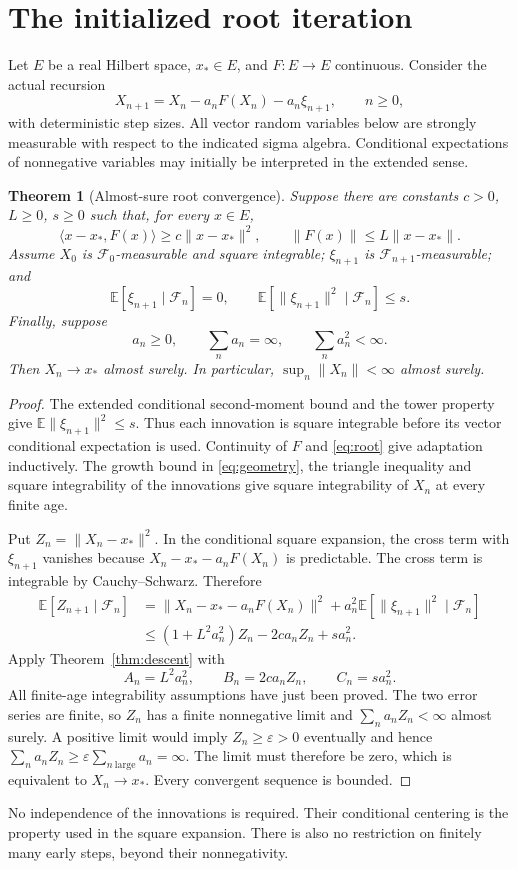 \documentclass[11pt]{article}
\newtheorem{theorem}{Theorem}[section]
\newcommand{\E}{\mathbb E}
\newcommand{\F}{\mathcal F}
\begin{document}
\section{The initialized root iteration}
Let $E$ be a real Hilbert space, $x_*\in E$, and $F:E\to E$ continuous.
Consider the actual recursion
\begin{equation}\label{eq:root}
 X_{n+1}=X_n-a_nF(X_n)-a_n\xi_{n+1},\qquad n\ge0,
\end{equation}
with deterministic step sizes. All vector random variables below are strongly
measurable with respect to the indicated sigma algebra. Conditional
expectations of nonnegative variables may initially be interpreted in the
extended sense.

\begin{theorem}[Almost-sure root convergence]\label{thm:root}
Suppose there are constants $c>0$, $L\ge0$, $s\ge0$ such that, for every $x\in E$,
\begin{equation}\label{eq:geometry}
 \langle x-x_*,F(x)\rangle\ge c\|x-x_*\|^2,
 \qquad \|F(x)\|\le L\|x-x_*\|.
\end{equation}
Assume $X_0$ is $\F_0$-measurable and square integrable; $\xi_{n+1}$ is
$\F_{n+1}$-measurable; and
\[
 \E[\xi_{n+1}\mid\F_n]=0,\qquad
 \E[\|\xi_{n+1}\|^2\mid\F_n]\le s.
\]
Finally, suppose
\[
 a_n\ge0,\qquad \sum_n a_n=\infty,\qquad \sum_n a_n^2<\infty.
\]
Then $X_n\to x_*$ almost surely. In particular, $\sup_n\|X_n\|<\infty$
almost surely.
\end{theorem}
\begin{proof}
The extended conditional second-moment bound and the tower property give
$\E\|\xi_{n+1}\|^2\le s$. Thus each innovation is square integrable before
its vector conditional expectation is used. Continuity of $F$ and
\eqref{eq:root} give adaptation inductively. The growth bound in
\eqref{eq:geometry}, the triangle inequality and square integrability of
the innovations give square integrability of $X_n$ at every finite age.

Put $Z_n=\|X_n-x_*\|^2$. In the conditional square expansion, the cross term
with $\xi_{n+1}$ vanishes because $X_n-x_*-a_nF(X_n)$ is predictable.
The cross term is integrable by Cauchy--Schwarz. Therefore
\begin{align*}
 \E[Z_{n+1}\mid\F_n]
 &=\|X_n-x_*-a_nF(X_n)\|^2
   +a_n^2\E[\|\xi_{n+1}\|^2\mid\F_n]\\
 &\le(1+L^2a_n^2)Z_n-2ca_nZ_n+sa_n^2.
\end{align*}
Apply Theorem~\ref{thm:descent} with
\[
 A_n=L^2a_n^2,\qquad B_n=2ca_nZ_n,\qquad C_n=sa_n^2.
\]
All finite-age integrability assumptions have just been proved. The two error
series are finite, so $Z_n$ has a finite nonnegative limit and
$\sum_n a_n Z_n<\infty$ almost surely. A positive limit would imply
$Z_n\ge\varepsilon>0$ eventually and hence
$\sum_n a_nZ_n\ge\varepsilon\sum_{n\ \mathrm{large}}a_n=\infty$.
The limit must therefore be zero, which is equivalent to $X_n\to x_*$.
Every convergent sequence is bounded.
\end{proof}
No independence of the innovations is required. Their conditional centering
is the property used in the square expansion. There is also no restriction
on finitely many early steps, beyond their nonnegativity.
\end{document}
